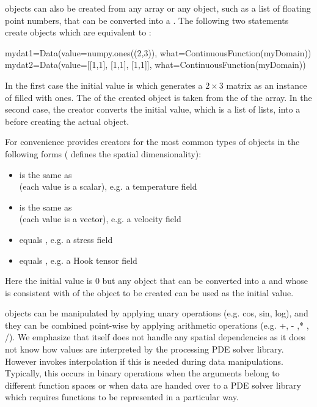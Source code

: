 \Data objects can also be created from any \numpy array or any object, such
as a list of floating point numbers, that can be converted into
a \numpyNDA\cite{NUMPY}.
The following two statements create objects which are equivalent
to :
\begin{python}
  mydat1=Data(value=numpy.ones((2,3)), what=ContinuousFunction(myDomain))
  mydat2=Data(value=[[1,1], [1,1], [1,1]], what=ContinuousFunction(myDomain))
\end{python}
In the first case the initial value is  which generates
a $2 \times 3$ matrix as an instance of \numpyNDA filled with ones.
The \Shape of the created \Data object is taken from the \Shape of the array.
In the second case, the creator converts the initial value, which is a list of
lists, into a \numpyNDA before creating the actual \Data object.

For convenience \escript provides creators for the most common types
of \Data objects in the following forms ( defines the spatial
dimensionality):
\begin{itemize}
\item {} is the same as \\
    (each value is a scalar), e.g. a temperature field
\item {} is the same as \\
    (each value is a vector), e.g. a velocity field
\item {} equals ,
    e.g. a stress field
\item {} equals ,
    e.g. a Hook tensor field
\end{itemize}
Here the initial value is 0 but any object that can be converted into
a \numpyNDA and whose \Shape is consistent with \Shape of the \Data object to
be created can be used as the initial value.

\Data objects can be manipulated by applying unary operations (e.g. cos, sin,
log), and they can be combined point-wise by applying arithmetic operations
(e.g. +, - ,* , /).
We emphasize that \escript itself does not handle any spatial dependencies as
it does not know how values are interpreted by the processing PDE solver library.
However \escript invokes interpolation if this is needed during data manipulations.
Typically, this occurs in binary operations when the arguments belong to
different function spaces or when data are handed over to a PDE solver library
which requires functions to be represented in a particular way.

